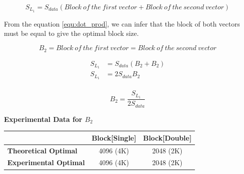 \[S_{L_1} = S_{data}(Block\ of\ the\ first\ vector + Block\ of\ the\ second\ vector)\]

From the equation \ref{equ:dot_prod}, we can infer that the block of both vectors must
be equal to give the optimal block size.

\[B_2 = Block\ of\ the\ first\ vector = Block\ of\ the\ second\ vector\]

\begin{align*}
    S_{L_1} &= S_{data}(B_2 + B_2)\\
    S_{L_1} &= 2S_{data}B_2\\
\end{align*}

\begin{equation}
    B_2 = \frac{S_{L_1}}{2S_{data}}
    \label{eq:dot_block2}
\end{equation}

\newpage
\textbf{Experimental Data for $B_2$}

\begin{figure}[htb]
    \centering
    \label{fig:dot_Stuning_block2}
    \qquad
    \label{fig:dot_Dtuning_block2}
\end{figure}

\begin{tabular}{l|c|c|}
    & \textbf{Block[Single]} & \textbf{Block[Double]}\\
    \hline
    \textbf{Theoretical Optimal} & 4096 (4K) & 2048 (2K)\\
    \hline
    \textbf{Experimental Optimal} & 4096 (4K) & 2048 (2K)\\
    \hline
\end{tabular}

